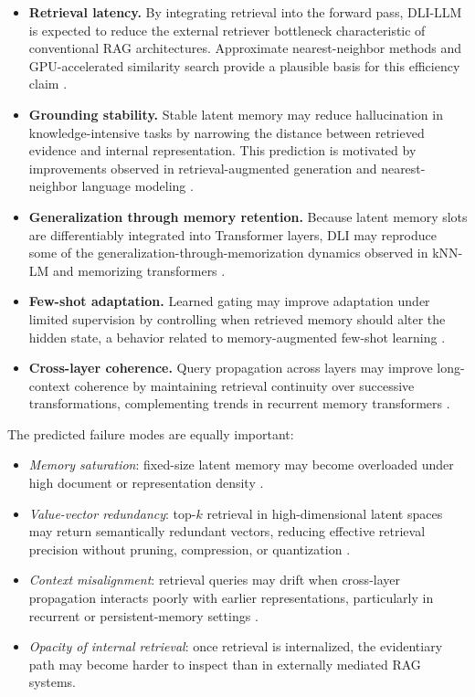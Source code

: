 \begin{itemize}
    \item \textbf{Retrieval latency.} By integrating retrieval into the forward pass, DLI-LLM is expected to reduce the external retriever bottleneck characteristic of conventional RAG architectures. Approximate nearest-neighbor methods and GPU-accelerated similarity search provide a plausible basis for this efficiency claim \cite{Jgou2011, Johnson2021}.
    \item \textbf{Grounding stability.} Stable latent memory may reduce hallucination in knowledge-intensive tasks by narrowing the distance between retrieved evidence and internal representation. This prediction is motivated by improvements observed in retrieval-augmented generation and nearest-neighbor language modeling \cite{Lewis2021, Khandelwal2020}.
    \item \textbf{Generalization through memory retention.} Because latent memory slots are differentiably integrated into Transformer layers, DLI may reproduce some of the generalization-through-memorization dynamics observed in kNN-LM and memorizing transformers \cite{Khandelwal2020, Wu2022}.
    \item \textbf{Few-shot adaptation.} Learned gating may improve adaptation under limited supervision by controlling when retrieved memory should alter the hidden state, a behavior related to memory-augmented few-shot learning \cite{Santoro2016}.
    \item \textbf{Cross-layer coherence.} Query propagation across layers may improve long-context coherence by maintaining retrieval continuity over successive transformations, complementing trends in recurrent memory transformers \cite{Bulatov2022}.
\end{itemize}

The predicted failure modes are equally important:

\begin{itemize}
    \item \textit{Memory saturation}: fixed-size latent memory may become overloaded under high document or representation density \cite{Graves2014, Wu2022}.
    \item \textit{Value-vector redundancy}: top-$k$ retrieval in high-dimensional latent spaces may return semantically redundant vectors, reducing effective retrieval precision without pruning, compression, or quantization \cite{Jgou2011, Johnson2021}.
    \item \textit{Context misalignment}: retrieval queries may drift when cross-layer propagation interacts poorly with earlier representations, particularly in recurrent or persistent-memory settings \cite{Bulatov2022}.
    \item \textit{Opacity of internal retrieval}: once retrieval is internalized, the evidentiary path may become harder to inspect than in externally mediated RAG systems.
\end{itemize}

